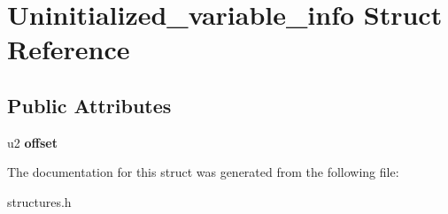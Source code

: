 \hypertarget{structUninitialized__variable__info}{}\section{Uninitialized\+\_\+variable\+\_\+info Struct Reference}
\label{structUninitialized__variable__info}
\subsection*{Public Attributes}
\begin{DoxyCompactItemize}
\item 
u2 {\bfseries offset}\hypertarget{structUninitialized__variable__info_aa80d6f40ad156843843eedf9b03f9add}{}\label{structUninitialized__variable__info_aa80d6f40ad156843843eedf9b03f9add}

\end{DoxyCompactItemize}


The documentation for this struct was generated from the following file\+:\begin{DoxyCompactItemize}
\item 
structures.\+h\end{DoxyCompactItemize}
